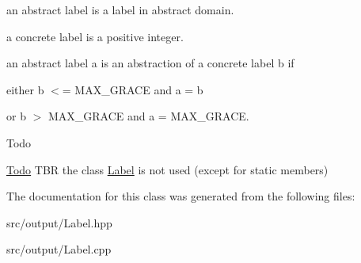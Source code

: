 an abstract label is a label in abstract domain.

a concrete label is a positive integer.

an abstract label a is an abstraction of a concrete label b if
\begin{DoxyItemize}
\item either b $<$= M\+A\+X\+\_\+\+G\+R\+A\+CE and a = b
\item or b $>$ M\+A\+X\+\_\+\+G\+R\+A\+CE and a = M\+A\+X\+\_\+\+G\+R\+A\+CE. \begin{DoxyRefDesc}{Todo}
\item[\mbox{\hyperlink{todo__todo000012}{Todo}}]T\+BR the class \mbox{\hyperlink{classLabel}{Label}} is not used (except for static members) \end{DoxyRefDesc}

\end{DoxyItemize}

The documentation for this class was generated from the following files\+:\begin{DoxyCompactItemize}
\item 
src/output/Label.\+hpp\item 
src/output/Label.\+cpp\end{DoxyCompactItemize}
